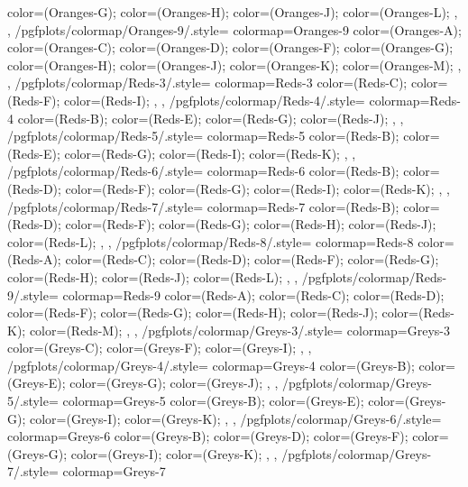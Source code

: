 {{{      color=(Oranges-G);
      color=(Oranges-H);
      color=(Oranges-J);
      color=(Oranges-L);
    },
  },
  /pgfplots/colormap/Oranges-9/.style={
    colormap={Oranges-9}{
      color=(Oranges-A);
      color=(Oranges-C);
      color=(Oranges-D);
      color=(Oranges-F);
      color=(Oranges-G);
      color=(Oranges-H);
      color=(Oranges-J);
      color=(Oranges-K);
      color=(Oranges-M);
    },
  },
  /pgfplots/colormap/Reds-3/.style={
    colormap={Reds-3}{
      color=(Reds-C);
      color=(Reds-F);
      color=(Reds-I);
    },
  },
  /pgfplots/colormap/Reds-4/.style={
    colormap={Reds-4}{
      color=(Reds-B);
      color=(Reds-E);
      color=(Reds-G);
      color=(Reds-J);
    },
  },
  /pgfplots/colormap/Reds-5/.style={
    colormap={Reds-5}{
      color=(Reds-B);
      color=(Reds-E);
      color=(Reds-G);
      color=(Reds-I);
      color=(Reds-K);
    },
  },
  /pgfplots/colormap/Reds-6/.style={
    colormap={Reds-6}{
      color=(Reds-B);
      color=(Reds-D);
      color=(Reds-F);
      color=(Reds-G);
      color=(Reds-I);
      color=(Reds-K);
    },
  },
  /pgfplots/colormap/Reds-7/.style={
    colormap={Reds-7}{
      color=(Reds-B);
      color=(Reds-D);
      color=(Reds-F);
      color=(Reds-G);
      color=(Reds-H);
      color=(Reds-J);
      color=(Reds-L);
    },
  },
  /pgfplots/colormap/Reds-8/.style={
    colormap={Reds-8}{
      color=(Reds-A);
      color=(Reds-C);
      color=(Reds-D);
      color=(Reds-F);
      color=(Reds-G);
      color=(Reds-H);
      color=(Reds-J);
      color=(Reds-L);
    },
  },
  /pgfplots/colormap/Reds-9/.style={
    colormap={Reds-9}{
      color=(Reds-A);
      color=(Reds-C);
      color=(Reds-D);
      color=(Reds-F);
      color=(Reds-G);
      color=(Reds-H);
      color=(Reds-J);
      color=(Reds-K);
      color=(Reds-M);
    },
  },
  /pgfplots/colormap/Greys-3/.style={
    colormap={Greys-3}{
      color=(Greys-C);
      color=(Greys-F);
      color=(Greys-I);
    },
  },
  /pgfplots/colormap/Greys-4/.style={
    colormap={Greys-4}{
      color=(Greys-B);
      color=(Greys-E);
      color=(Greys-G);
      color=(Greys-J);
    },
  },
  /pgfplots/colormap/Greys-5/.style={
    colormap={Greys-5}{
      color=(Greys-B);
      color=(Greys-E);
      color=(Greys-G);
      color=(Greys-I);
      color=(Greys-K);
    },
  },
  /pgfplots/colormap/Greys-6/.style={
    colormap={Greys-6}{
      color=(Greys-B);
      color=(Greys-D);
      color=(Greys-F);
      color=(Greys-G);
      color=(Greys-I);
      color=(Greys-K);
    },
  },
  /pgfplots/colormap/Greys-7/.style={
    colormap={Greys-7}{
}}}
